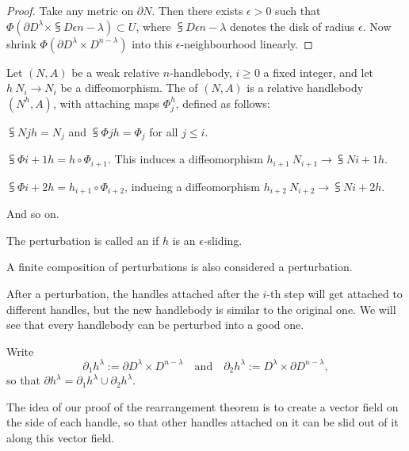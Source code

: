 \begin{proof}
    Take any metric on $\partial N$.
    Then there exists $\epsilon>0$
    such that $\Phi(\partial D^\lambda\times\subsup D\epsilon{n-\lambda})\subset U$,
    where $\subsup D\epsilon{n-\lambda}$ denotes the disk of radius $\epsilon$.
    Now shrink $\Phi(\partial D^\lambda\times D^{n-\lambda})$ into this $\epsilon$-neighbourhood linearly.
\end{proof}

\begin{definition}
    Let $(N,A)$ be a weak relative $n$-handlebody, $i\geq0$ a fixed integer,
    and let $h\:N_i\to N_i$ be a diffeomorphism.
    The  of $(N,A)$ is a relative handlebody $(N^h,A)$,
    with attaching maps $\Phi^h_j$, defined as follows:
    \begin{itms}
        \item $\subsup Njh=N_j$ and $\subsup\Phi jh=\Phi_j$ for all $j\leq i$.
        \item $\subsup\Phi{i+1}h=h\circ\Phi_{i+1}$. 
        This induces a diffeomorphism $h_{i+1}\:N_{i+1}\to\subsup N{i+1}h$.
        \item $\subsup\Phi{i+2}h=h_{i+1}\circ\Phi_{i+2}$,
        inducing a diffeomorphism $h_{i+2}\:N_{i+2}\to\subsup N{i+2}h$.
        \item And so on.
    \end{itms}
    The perturbation is called an  if $h$ is an $\epsilon$-sliding.
    
    A finite composition of perturbations
    is also considered a perturbation.
\end{definition}

After a perturbation, the handles attached after the $i$-th step
will get attached to different handles,
but the new handlebody is similar to the original one.
We will see that every handlebody can be perturbed into a good one.

\begin{notation}
    Write
    \[ \partial_1h^\lambda := \partial D^\lambda \times D^{n-\lambda}
    \quad\text{and}\quad
    \partial_2h^\lambda := D^\lambda \times \partial D^{n-\lambda}, \]
    so that $\partial h^\lambda = \partial_1h^\lambda \cup \partial_2h^\lambda$.
    \varqed
\end{notation}

The idea of our proof of the rearrangement theorem 
is to create a vector field on the side of each handle,
so that other handles attached on it
can be slid out of it along this vector field.

